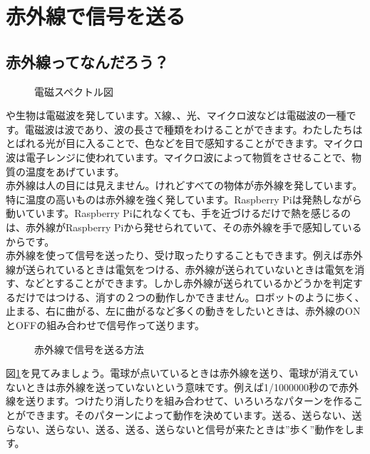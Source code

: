 \section{赤外線で信号を送る}
\subsection{赤外線ってなんだろう？}

\begin{figure}[H]
\centering

\caption{電磁スペクトル図}

\end{figure}

や生物は電磁波を発しています。X線、、光、マイクロ波などは電磁波の一種です。電磁波は波であり、波の長さで種類をわけることができます。わたしたちはとばれる光が目に入ることで、色などを目で感知することができます。マイクロ波は電子レンジに使われています。マイクロ波によって物質をさせることで、物質の温度をあげています。\\

赤外線は人の目には見えません。けれどすべての物体が赤外線を発しています。特に温度の高いものは赤外線を強く発しています。Raspberry Piは発熱しながら動いています。Raspberry Piにれなくても、手を近づけるだけで熱を感じるのは、赤外線がRaspberry Piから発せられていて、その赤外線を手で感知しているからです。\\

赤外線を使って信号を送ったり、受け取ったりすることもできます。例えば赤外線が送られているときは電気をつける、赤外線が送られていないときは電気を消す、などとすることができます。しかし赤外線が送られているかどうかを判定するだけではつける、消すの２つの動作しかできません。ロボットのように歩く、止まる、右に曲がる、左に曲がるなど多くの動きをしたいときは、赤外線のONとOFFの組み合わせで信号作って送ります。

\begin{figure}[H]
\centering

\caption{赤外線で信号を送る方法}
\label{ir}
\end{figure}

図\ref{ir}を見てみましょう。電球が点いているときは赤外線を送り、電球が消えていないときは赤外線を送っていないという意味です。例えば1/1000000秒ので赤外線を送ります。つけたり消したりを組み合わせて、いろいろなパターンを作ることができます。そのパターンによって動作を決めています。送る、送らない、送らない、送らない、送る、送る、送らないと信号が来たときは”歩く”動作をします。
